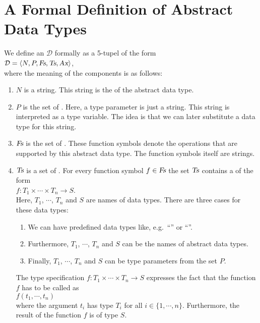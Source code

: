 \section[Formal Definition]{A Formal Definition of Abstract Data Types}
We define an  $\mathcal{D}$ formally as a 5-tupel of the form 
\\[0.2cm]
\hspace*{1.3cm}
 $\mathcal{D} = \langle N, P, \textsl{Fs}, \textsl{Ts}, \textsl{Ax} \rangle$,
\\[0.2cm] 
where the meaning of the components is as follows:
\begin{enumerate}
\item $N$ is a string.  This string is the  of the abstract data type. 
\item $P$ is the set of .   Here, a type parameter is just a string.
      This string is interpreted as a type variable.  The idea is that we can later substitute 
      a data type for this string. 
\item $\textsl{Fs}$ is the set of .  These function symbols denote the 
      operations that are supported by this abstract data type. The function symbols itself are strings.
\item $\textsl{Ts}$ is a set of .  For every function symbol
      $f \in \textsl{Fs}$
      the set $\textsl{Ts}$ contains a  of the form 
      \\[0.2cm]
      \hspace*{1.3cm} 
      $f: T_1 \times \cdots \times T_n \rightarrow S$. 
      \\[0.2cm]
      Here,  $T_1$, $\cdots$, $T_n$ and $S$ are names of data types.  There are three cases for
      these data types: 
      \begin{enumerate}
      \item We can have predefined data types like, e.g.~``'' or ``''.
      \item Furthermore, $T_1$, $\cdots$, $T_n$ and $S$ can be the names of abstract data types.
      \item Finally,  $T_1$, $\cdots$, $T_n$ and $S$ can be type parameters from the set $P$.
      \end{enumerate}
      The type specification $f: T_1 \times \cdots \times T_n \rightarrow S$ expresses the fact that
      the function $f$ has to be called as \\[0.2cm] 
      \hspace*{1.3cm}
      $f(t_1,\cdots,t_n)$ 
      \\[0.2cm]
      where the argument $t_i$ has type $T_i$ for all $i \in \{1,\cdots,n\}$.
      Furthermore, the result of the function $f$ is of type $S$.


\end{enumerate}
